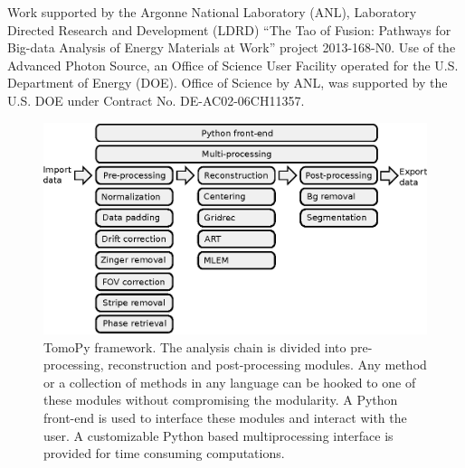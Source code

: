 \documentclass[pdf]{iucr}              %
\begin{document}




Work supported by the Argonne National Laboratory (ANL), Laboratory Directed Research and Development (LDRD) ``The Tao of Fusion: Pathways for Big-data Analysis of Energy Materials at Work'' project 2013-168-N0. Use of the Advanced Photon Source, an Office of Science User Facility operated for the U.S. Department of Energy (DOE). Office of Science by ANL, was supported by the U.S. DOE under Contract No. DE-AC02-06CH11357. 





\begin{figure}
\centering
\includegraphics[width=\textwidth]{figs/framework1.eps}
\caption{TomoPy framework. The analysis chain is divided into pre-processing, reconstruction and post-processing modules. Any method or a collection of methods in any language can be hooked to one of these modules without compromising the modularity. A Python front-end is used to interface these modules and interact with the user. A customizable Python based multiprocessing interface is provided for time consuming computations.}
\label{fig:Framework}
\end{figure}
\end{document}
